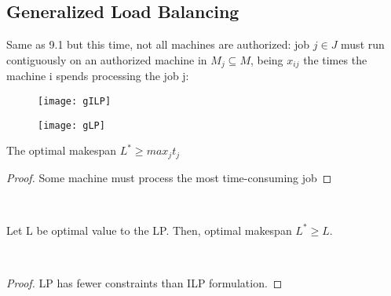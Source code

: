 \subsection{Generalized Load Balancing}
Same as 9.1 but this time, not all machines are authorized: job $j \in J$ must run contiguously on an authorized machine in $M_{j} \subseteq M$, being $x_{ij}$ the times the machine i spends processing the job j:

\begin{figure}[H]
    \centering
    \texttt{[image: gILP]}
\end{figure}

\begin{figure}[H]
    \centering
    \texttt{[image: gLP]}
\end{figure}

\begin{claim}
    The optimal makespan $L^{*} ≥ max_{j} t_{j}$
\end{claim}
\begin{proof}
    Some machine must process the most time-consuming job
\end{proof}\\
\begin{claim}
    Let L be optimal value to the LP. Then, optimal makespan $L^{*} \geq L$.
\end{claim}\\
\begin{proof}
    LP has fewer constraints than ILP formulation.
\end{proof}
